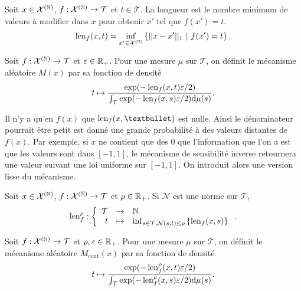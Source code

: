\begin{definition}[Longueur]
    Soit \(x \in \mathcal X^{(\mathbb{N})}\), \(f : \mathcal X^{(\mathbb{N})} \to \mathcal T\) et \(t \in \mathcal T\). La longueur est le nombre minimum de valeurs à modifier dans \(x\) pour obtenir \(x'\) tel que \(f(x') = t\). 
    \[
        \operatorname{len}_f(x,t) = \inf_{x' \in \mathcal X^{(\mathbb{N})}}\left\{|| x - x'||_1 \ |\ f(x') = t \right\}.
    \]
\end{definition}

\begin{definition}
    Soit \(f : \mathcal X^{(\mathbb{N})} \to \mathcal T\) et \(\varepsilon \in \mathbb{R}_+\). Pour une mesure \(\mu\) sur \(\mathcal T\), on définit le mécanisme aléatoire \(M(x)\) par sa fonction de densité 
    \[
        t \mapsto \dfrac{\exp(-\operatorname{len}_f(x, t)\varepsilon/2)}{\int_\mathcal T \exp(-\operatorname{len}_f(x, s)\varepsilon/2)\mathrm{d} \mu(s)}.
    \] 
\end{definition}

Il n'y a qu'en \(f(x)\) que \(\len_f(x,•)\) est nulle. Ainsi le dénominateur pourrait être petit est donné une grande probabilité à des valeurs distantes de \(f(x)\). Par exemple, si \(x\) ne contient que des \(0\) que l'information que l'on a est que les valeurs sont dans \([-1,1]\), le mécanisme de sensibilité inverse retournera une valeur suivant une loi uniforme sur \([-1, 1]\). On \cite{mcsherry2007mechanism} introduit alors une version lisse du mécanisme.\\


\begin{definition}
    Soit \(x \in \mathcal X^{(\mathbb{N})}\), \(f : \mathcal X^{(\mathbb{N})} \to \mathcal T\) et \(\rho \in \mathbb{R}_+\). Si \(\mathcal N\) est une norme sur \(\mathcal T\),
    \[
        \len_f^{\rho} : 
        \left\{
            \begin{array}[]{rcl}
                \mathcal T & \to & \N\\
                t & \mapsto & \inf_{s \in \mathcal T, \mathcal N(s,t) \leq \rho}\left\{\len_f(x,s) \right\}  
            \end{array}
        \right. .   
    \]
\end{definition}

\begin{definition}
    Soit \(f : \mathcal X^{(\mathbb{N})} \to \mathcal T\) et \(\rho, \varepsilon \in \mathbb{R}_+\). Pour une mesure \(\mu\) sur \(\mathcal T\), on définit le mécanisme aléatoire \(M_{\text{cont}}(x)\) par sa fonction de densité 
    \[
        t \mapsto \dfrac{\exp(-\operatorname{len}_f^\rho(x, t)\varepsilon/2)}{\int_\mathcal T \exp(-\operatorname{len}_f^\rho(x, s)\varepsilon/2)\mathrm{d} \mu(s)}.   
    \] 
\end{definition}


